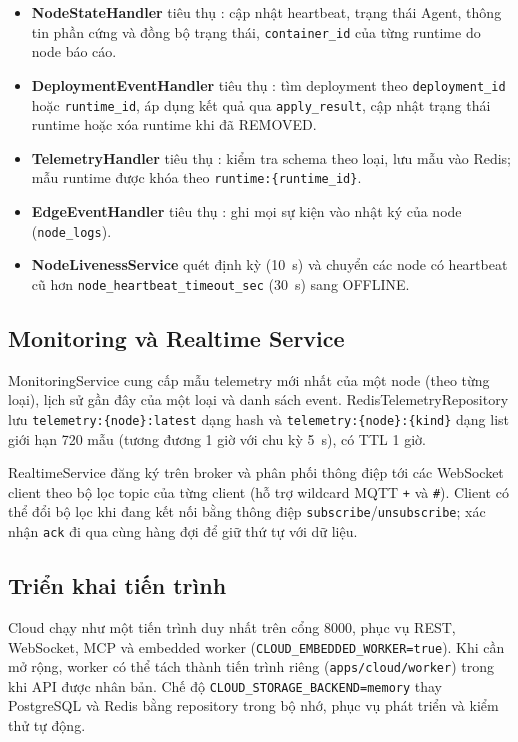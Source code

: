 \begin{itemize}
  \item \textbf{NodeStateHandler} tiêu thụ : cập nhật
        heartbeat, trạng thái Agent, thông tin phần cứng và đồng bộ trạng thái,
        \texttt{container\_id} của từng runtime do node báo cáo.
  \item \textbf{DeploymentEventHandler} tiêu thụ : tìm
        deployment theo \texttt{deployment\_id} hoặc \texttt{runtime\_id}, áp dụng
        kết quả qua \texttt{apply\_result}, cập nhật trạng thái runtime hoặc xóa
        runtime khi đã REMOVED.
  \item \textbf{TelemetryHandler} tiêu thụ : kiểm tra schema
        theo loại, lưu mẫu vào Redis; mẫu runtime được khóa theo
        \texttt{runtime:\{runtime\_id\}}.
  \item \textbf{EdgeEventHandler} tiêu thụ : ghi mọi sự kiện vào nhật
        ký của node (\texttt{node\_logs}).
  \item \textbf{NodeLivenessService} quét định kỳ (10~s) và chuyển các node có
        heartbeat cũ hơn \texttt{node\_heartbeat\_timeout\_sec} (30~s) sang OFFLINE.
\end{itemize}

\subsection{Monitoring và Realtime Service}

MonitoringService cung cấp mẫu telemetry mới nhất của một node (theo từng loại),
lịch sử gần đây của một loại và danh sách event. RedisTelemetryRepository lưu
\texttt{telemetry:\{node\}:latest} dạng hash và \texttt{telemetry:\{node\}:\{kind\}}
dạng list giới hạn 720 mẫu (tương đương 1 giờ với chu kỳ 5~s), có TTL 1 giờ.

RealtimeService đăng ký  trên broker và phân phối thông điệp tới các
WebSocket client theo bộ lọc topic của từng client (hỗ trợ wildcard MQTT
\texttt{+} và \texttt{\#}). Client có thể đổi bộ lọc khi đang kết nối bằng thông
điệp \texttt{subscribe}/\texttt{unsubscribe}; xác nhận \texttt{ack} đi qua cùng
hàng đợi để giữ thứ tự với dữ liệu.

\subsection{Triển khai tiến trình}

Cloud chạy như một tiến trình duy nhất trên cổng 8000, phục vụ REST, WebSocket,
MCP và embedded worker (\texttt{CLOUD\_EMBEDDED\_WORKER=true}). Khi cần mở rộng,
worker có thể tách thành tiến trình riêng (\texttt{apps/cloud/worker}) trong khi API
được nhân bản. Chế độ \texttt{CLOUD\_STORAGE\_BACKEND=memory} thay PostgreSQL và
Redis bằng repository trong bộ nhớ, phục vụ phát triển và kiểm thử tự động.
